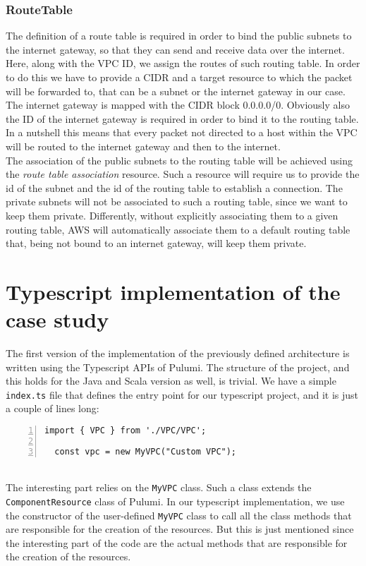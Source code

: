 \subsubsection{RouteTable}
\label{sssec:routetable}
The definition of a route table is required in order to bind the public subnets to the internet gateway, so that they can send and receive data over the internet.\\
Here, along with the VPC ID, we assign the routes of such routing table.
In order to do this we have to provide a CIDR and a target resource to which the packet will be forwarded to, that can be a subnet or the internet gateway in our case.
The internet gateway is mapped with the CIDR block 0.0.0.0/0.
Obviously also the ID of the internet gateway is required in order to bind it to the routing table.\\
In a nutshell this means that every packet not directed to a host within the VPC will be routed to the internet gateway and then to the internet.\\
The association of the public subnets to the routing table will be achieved using the \textit{route table association} resource.
Such a resource will require us to provide the id of the subnet and the id of the routing table to establish a connection.
The private subnets will not be associated to such a routing table, since we want to keep them private.
Differently, without explicitly associating them to a given routing table, AWS will automatically associate them to a default routing table that, being not bound to an internet gateway, will keep them private.\\


\section{Typescript implementation of the case study}
\label{sec:typescript-impl}
The first version of the implementation of the previously defined architecture is written using the Typescript APIs of Pulumi.
The structure of the project, and this holds for the Java and Scala version as well, is trivial.
We have a simple \texttt{index.ts} file that defines the entry point for our typescript project, and it is just a couple of lines long:
\begin{lstlisting}[numbers=left, numberstyle=\tiny, numbersep=-5pt, stepnumber=1]
  import { VPC } from './VPC/VPC';

  const vpc = new MyVPC("Custom VPC");
\end{lstlisting}\mbox{}\\
The interesting part relies on the \texttt{MyVPC} class.
Such a class extends the \texttt{ComponentResource} class of Pulumi.
In our typescript implementation, we use the constructor of the user-defined \texttt{MyVPC} class to call all the class methods that are responsible for the creation of the resources.
But this is just mentioned since the interesting part of the code are the actual methods that are responsible for the creation of the resources.

